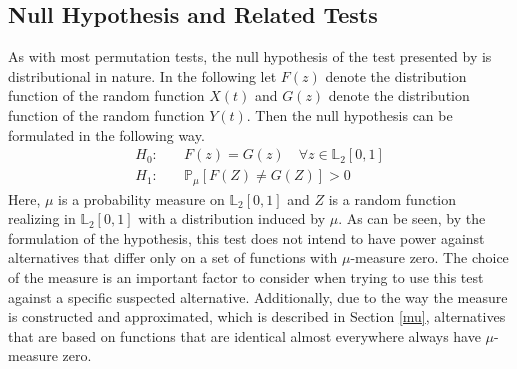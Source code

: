 \documentclass[12pt, a4paper]{article}
\theoremstyle{MAstyle} \newtheorem{assumption}{Assumption}[section]
\theoremstyle{MAstyle} \newtheorem{definition}{Definition}[section]
\theoremstyle{MAstyle} \newtheorem{theorem}{Theorem}[section]
\begin{document}
		\subsection{Null Hypothesis and Related Tests}
			As with most permutation tests, the null hypothesis of the test presented by \cite{bugni_permutation_2021} is distributional in nature. In the following let $F(z)$ denote the distribution function of the random function $X(t)$ and $G(z)$ denote the distribution function of the random function $Y(t)$. Then the null hypothesis can be formulated in the following way.
			\begin{equation}
				\begin{split}
					H_0: \quad &F(z) = G(z) \quad \forall z \in \mathbb{L}_2[0,1] \\
					H_1: \quad &\mathbb{P}_{\mu}\left[F(Z) \neq G(Z)\right] > 0
				\end{split}
			\end{equation}
			Here, $\mu$ is a probability measure on $\mathbb{L}_2[0,1]$ and $Z$ is a random function realizing in $\mathbb{L}_2[0,1]$ with a distribution induced by $\mu$. As can be seen, by the formulation of the hypothesis, this test does not intend to have power against alternatives that differ only on a set of functions with $\mu$-measure zero. The choice of the measure is an important factor to consider when trying to use this test against a specific suspected alternative. Additionally, due to the way the measure is constructed and approximated, which is described in Section \ref{mu}, alternatives that are based on functions that are identical almost everywhere always have $\mu$-measure zero. \\
			
\end{document}
